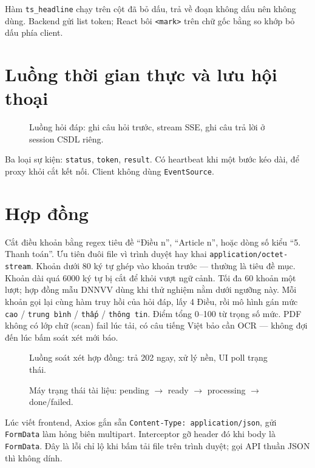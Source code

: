 Hàm \texttt{ts\_headline} chạy trên cột đã bỏ dấu, trả về đoạn không dấu nên
không dùng. Backend gửi list token; React bôi \texttt{<mark>} trên chữ gốc
bằng so khớp bỏ dấu phía client.

\section{Luồng thời gian thực và lưu hội thoại}

\begin{figure}[htp]
\centering
\hinhChatSeq
\caption{Luồng hỏi đáp: ghi câu hỏi trước, stream SSE, ghi câu trả lời ở session CSDL riêng.}
\label{fig:tuan-tu-chat}
\end{figure}

Ba loại sự kiện: \texttt{status}, \texttt{token}, \texttt{result}. Có heartbeat
khi một bước kéo dài, để proxy khỏi cắt kết nối. Client không dùng
\texttt{EventSource}.

\section{Hợp đồng}

Cắt điều khoản bằng regex tiêu đề ``Điều n'', ``Article n'', hoặc dòng số kiểu
``5. Thanh toán''. Ưu tiên đuôi file vì trình duyệt hay khai
\texttt{application/octet-stream}. Khoản dưới 80 ký tự ghép vào khoản trước ---
thường là tiêu đề mục. Khoản dài quá 6000 ký tự bị cắt để khỏi vượt ngữ cảnh.
Tối đa 60 khoản một lượt; hợp đồng mẫu DNNVV dùng khi thử nghiệm nằm dưới ngưỡng
này. Mỗi khoản gọi lại cùng hàm truy hồi của hỏi đáp, lấy 4 Điều, rồi mô hình
gán mức \texttt{cao} / \texttt{trung bình} / \texttt{thấp} / \texttt{thông tin}.
Điểm tổng 0--100 từ trọng số mức. PDF không có lớp chữ (scan) fail lúc tải, có
câu tiếng Việt bảo cần OCR --- không đợi đến lúc bấm soát xét mới báo.

\begin{figure}[htp]
\centering
\resizebox{0.95\linewidth}{!}{\hinhHopDongSeq}
\caption{Luồng soát xét hợp đồng: trả 202 ngay, xử lý nền, UI poll trạng thái.}
\label{fig:tuan-tu-hopdong}
\end{figure}

\begin{figure}[htp]
\centering
\hinhTrangThai
\caption{Máy trạng thái tài liệu: pending $\rightarrow$ ready $\rightarrow$ processing $\rightarrow$ done/failed.}
\label{fig:trang-thai-tai-lieu}
\end{figure}

Lúc viết frontend, Axios gắn sẵn \texttt{Content-Type: application/json}, gửi
\texttt{FormData} làm hỏng biên multipart. Interceptor gỡ header đó khi body là
\texttt{FormData}. Đây là lỗi chỉ lộ khi bấm tải file trên trình duyệt; gọi API
thuần JSON thì không dính.

